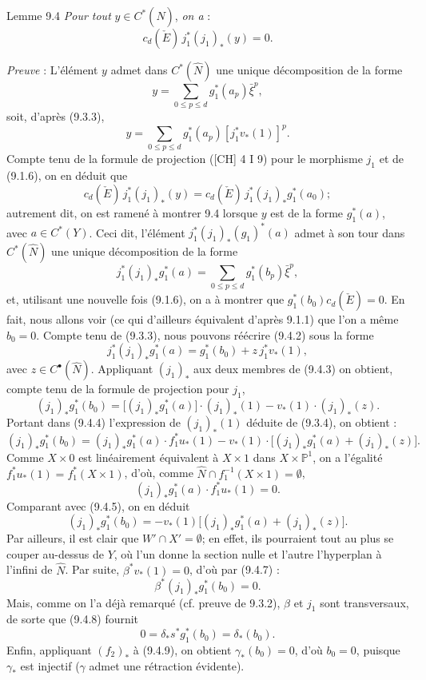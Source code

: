 \begin{statement}{Lemme 9.4}
\emph{Pour tout} $y\in C^*(\widehat N)$, \emph{on a} :
\[
c_d(\check E)\,j_1^*(j_1)_*(y)=0.
\]
\end{statement}

\emph{Preuve} : L'élément $y$ admet dans $C^*(\widehat N)$ une unique décomposition de la forme
\[
y=\sum_{0\le p\le d}g_1^*(a_p)\bar\xi^p,
\]
soit, d'après (9.3.3),
\[
y=\sum_{0\le p\le d}g_1^*(a_p)[j_1^*v_*(1)]^p.
\tag{9.4.1}
\]
Compte tenu de la formule de projection ([CH] 4 I 9) pour le morphisme $j_1$ et de (9.1.6), on en déduit que
\[
c_d(\check E)\,j_1^*(j_1)_*(y)=c_d(\check E)\,j_1^*(j_1)_*g_1^*(a_0);
\]
autrement dit, on est ramené à montrer 9.4 lorsque $y$ est de la forme $g_1^*(a)$, avec $a\in C^*(Y)$. Ceci dit, l'élément $j_1^*(j_1)_*(g_1)^*(a)$ admet à son tour dans $C^*(\widehat N)$ une unique décomposition de la forme
\[
j_1^*(j_1)_*g_1^*(a)=\sum_{0\le p\le d}g_1^*(b_p)\bar\xi^p,
\tag{9.4.2}
\]
et,
utilisant une nouvelle fois (9.1.6), on a à montrer que $g_1^*(b_0)c_d(\check E)=0$. En fait, nous allons voir (ce qui d'ailleurs équivalent d'après 9.1.1) que l'on a même $b_0=0$. Compte tenu de (9.3.3), nous pouvons réécrire (9.4.2) sous la forme
\[
j_1^*(j_1)_*g_1^*(a)=g_1^*(b_0)+z\,j_1^*v_*(1),
\tag{9.4.3}
\]
avec $z\in C^{\bullet}(\widehat N)$. Appliquant $(j_1)_*$ aux deux membres de (9.4.3) on obtient, compte tenu de la formule de projection pour $j_1$,
\[
(j_1)_*g_1^*(b_0)=\bigl[(j_1)_*g_1^*(a)\bigr]\cdot(j_1)_*(1)-v_*(1)\cdot(j_1)_*(z).
\tag{9.4.4}
\]
Portant dans (9.4.4) l'expression de $(j_1)_*(1)$ déduite de (9.3.4), on obtient :
\[
(j_1)_*g_1^*(b_0)=
(j_1)_*g_1^*(a)\cdot f_1^*u_*(1)-v_*(1)\cdot\bigl[(j_1)_*g_1^*(a)+(j_1)_*(z)\bigr].
\tag{9.4.5}
\]
Comme $X\times0$ est linéairement équivalent à $X\times1$ dans $X\times\mathbb{P}^1$, on a l'égalité $f_1^*u_*(1)=f_1^*(X\times1)$, d'où, comme $\widehat N\cap f_1^{-1}(X\times1)=\emptyset$,
\[
(j_1)_*g_1^*(a)\cdot f_1^*u_*(1)=0.
\tag{9.4.6}
\]
Comparant avec (9.4.5), on en déduit
\[
(j_1)_*g_1^*(b_0)=-v_*(1)\bigl[(j_1)_*g_1^*(a)+(j_1)_*(z)\bigr].
\tag{9.4.7}
\]
Par ailleurs, il est clair que $W'\cap X'=\emptyset$; en effet, ils pourraient tout au plus se couper au-dessus de $Y$, où l'un donne la section nulle et l'autre l'hyperplan à l'infini de $\widehat N$. Par suite, $\beta^*v_*(1)=0$, d'où par (9.4.7) :
\[
\beta^*(j_1)_*g_1^*(b_0)=0.
\tag{9.4.8}
\]
Mais, comme on l'a déjà remarqué (cf. preuve de 9.3.2), $\beta$ et $j_1$ sont transversaux, de sorte que (9.4.8) fournit
\[
0=\delta_*s^*g_1^*(b_0)=\delta_*(b_0).
\tag{9.4.9}
\]
Enfin,
appliquant $(f_2)_*$ à (9.4.9), on obtient $\gamma_*(b_0)=0$, d'où $b_0=0$, puisque $\gamma_*$ est injectif ($\gamma$ admet une rétraction évidente).

